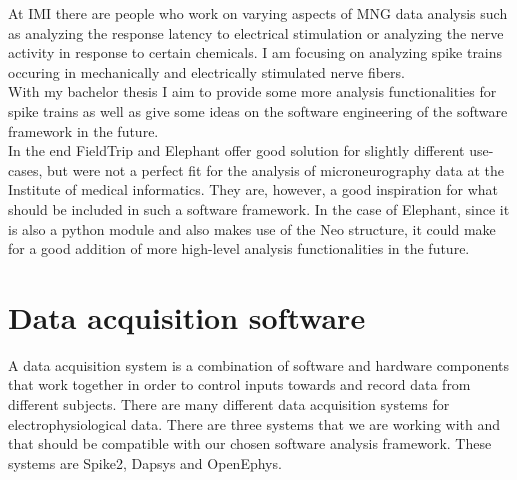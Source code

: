 At IMI there are people who work on varying aspects of MNG data analysis such as analyzing the response latency to electrical stimulation or analyzing the nerve activity in response to certain chemicals. I am focusing on analyzing spike trains occuring in mechanically and electrically stimulated nerve fibers.\\
With my bachelor thesis I aim to provide some more analysis functionalities for spike trains as well as give some ideas on the software engineering of the software framework in the future.\\
In the end FieldTrip and Elephant offer good solution for slightly different use-cases, but were not a perfect fit for the analysis of microneurography data at the Institute of medical informatics. They are, however, a good inspiration for what should be included in such a software framework. In the case of Elephant, since it is also a python module and also makes use of the Neo structure, it could make for a good addition of more high-level analysis functionalities in the future.

\section{Data acquisition software} 
A data acquisition system is a combination of software and hardware components that work together in order to control inputs towards and record data from different subjects.
There are many different data acquisition systems for electrophysiological data. There are three systems that we are working with and that should be compatible with our chosen software analysis framework. These systems are Spike2, Dapsys and OpenEphys.

